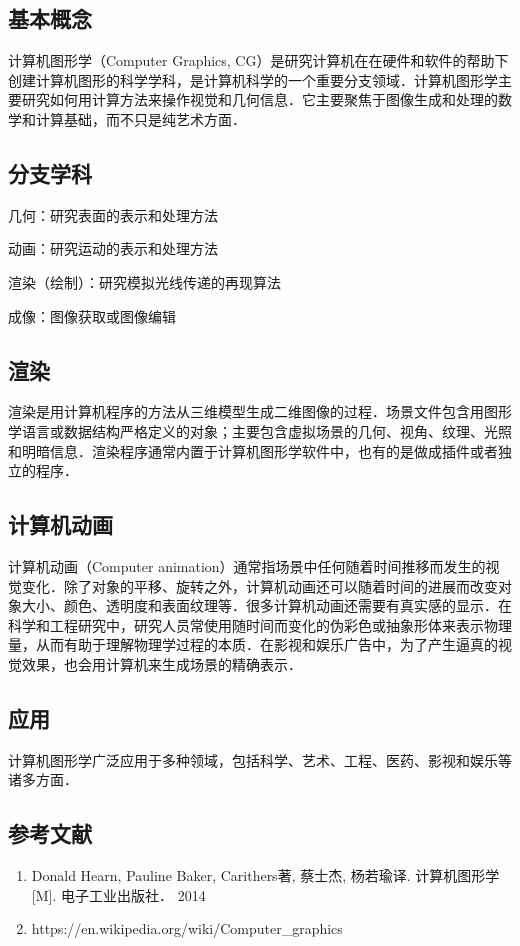 
\subsection{基本概念}
计算机图形学（Computer Graphics, CG）是研究计算机在在硬件和软件的帮助下创建计算机图形的科学学科，是计算机科学的一个重要分支领域．计算机图形学主要研究如何用计算方法来操作视觉和几何信息．它主要聚焦于图像生成和处理的数学和计算基础，而不只是纯艺术方面．

\subsection{分支学科}
几何：研究表面的表示和处理方法

动画：研究运动的表示和处理方法

渲染（绘制）：研究模拟光线传递的再现算法

成像：图像获取或图像编辑


\subsection{渲染}
渲染是用计算机程序的方法从三维模型生成二维图像的过程．场景文件包含用图形学语言或数据结构严格定义的对象；主要包含虚拟场景的几何、视角、纹理、光照和明暗信息．渲染程序通常内置于计算机图形学软件中，也有的是做成插件或者独立的程序．



\subsection{计算机动画}
计算机动画（Computer animation）通常指场景中任何随着时间推移而发生的视觉变化．除了对象的平移、旋转之外，计算机动画还可以随着时间的进展而改变对象大小、颜色、透明度和表面纹理等．很多计算机动画还需要有真实感的显示．在科学和工程研究中，研究人员常使用随时间而变化的伪彩色或抽象形体来表示物理量，从而有助于理解物理学过程的本质．在影视和娱乐广告中，为了产生逼真的视觉效果，也会用计算机来生成场景的精确表示．


\subsection{应用}
计算机图形学广泛应用于多种领域，包括科学、艺术、工程、医药、影视和娱乐等诸多方面．


\subsection{参考文献}
\begin{enumerate}
\item Donald Hearn, Pauline Baker, Carithers著, 蔡士杰, 杨若瑜译. 计算机图形学[M]. 电子工业出版社． 2014
\item https://en.wikipedia.org/wiki/Computer_graphics
\end{enumerate}